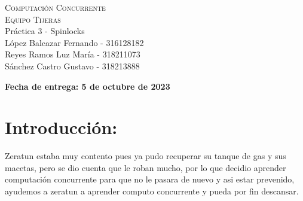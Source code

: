 \documentclass[12pt]{article}
\author{Fernando López Balcazar}
\begin{document}
\begin{titlepage}
\AddToShipoutPicture*{\BackgroundPic}
\begin{spacing}{1.5}
 \begin{figure}[t]
    \centering
\end{figure}
\begin{center}
	\textsc{\LARGE{Computaci\'on Concurrente\\ }}
	\vspace{15mm}
    \textsc{\LARGE{Equipo Tijeras\\}}
    \vspace{15mm}
	\fontsize{10mm}{7mm}\selectfont
	\textup{Pr\'actica 3 - Spinlocks}\\
	\vspace{20mm}
    \fontsize{8mm}{6mm}\selectfont
    López Balcazar Fernando - 316128182 \\
    Reyes Ramos Luz Mar\'ia - 318211073\\
    S\'anchez Castro Gustavo - 318213888
\end{center}

\vspace{30mm}

\vspace{8mm}
\begin{center}
    \textbf{\large{Fecha de entrega: 5 de octubre de 2023}}
\end{center}
\end{spacing}
\end{titlepage}
\restoregeometry

\section{Introducción:}
Zeratun estaba muy contento pues ya pudo recuperar su tanque de gas y sus macetas,
pero se dio cuenta que le roban mucho, por lo que decidio aprender computación
concurrente para que no le pasara de nuevo y asi estar prevenido, ayudemos a zeratun
a aprender computo concurrente y pueda por fin descansar.
\end{document}
